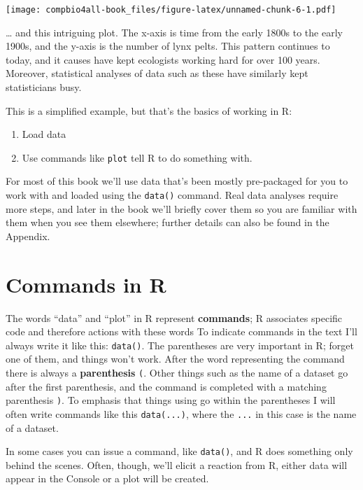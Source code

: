 \documentclass[
]{book}
\providecommand{\tightlist}{%
  \setlength{\itemsep}{0pt}\setlength{\parskip}{0pt}}
\begin{document}
\texttt{[image: compbio4all-book\_files/figure-latex/unnamed-chunk-6-1.pdf]}

\ldots{} and this intriguing plot. The x-axis is time from the early 1800s to the early 1900s, and the y-axis is the number of lynx pelts. This pattern continues to today, and it causes have kept ecologists working hard for over 100 years. Moreover, statistical analyses of data such as these have similarly kept statisticians busy.

This is a simplified example, but that's the basics of working in R:

\begin{enumerate}
\def\labelenumi{\arabic{enumi}.}
\tightlist
\item
  Load data
\item
  Use commands like \texttt{plot} tell R to do something with.
\end{enumerate}

For most of this book we'll use data that's been mostly pre-packaged for you to work with and loaded using the \texttt{data()} command. Real data analyses require more steps, and later in the book we'll briefly cover them so you are familiar with them when you see them elsewhere; further details can also be found in the Appendix.

\hypertarget{commands-in-r}{%
\section{Commands in R}\label{commands-in-r}}

The words ``data'' and ``plot'' in R represent \textbf{commands}; R associates specific code and therefore actions with these words To indicate commands in the text I'll always write it like this: \texttt{data()}. The parentheses are very important in R; forget one of them, and things won't work. After the word representing the command there is always a \textbf{parenthesis} \texttt{(}. Other things such as the name of a dataset go after the first parenthesis, and the command is completed with a matching parenthesis \texttt{)}. To emphasis that things using go within the parentheses I will often write commands like this \texttt{data(...)}, where the \texttt{...} in this case is the name of a dataset.

In some cases you can issue a command, like \texttt{data()}, and R does something only behind the scenes. Often, though, we'll elicit a reaction from R, either data will appear in the Console or a plot will be created.
\end{document}
